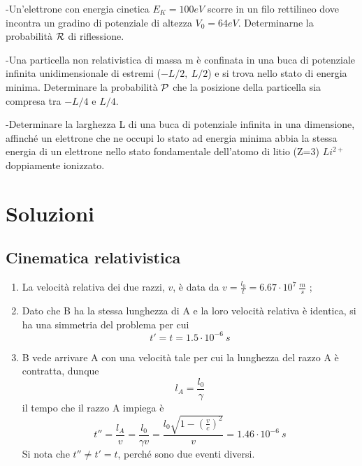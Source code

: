 \documentclass[12pt,twoside,a4]{article}
\begin{document}
\begin{esercizio}
	-Un'elettrone con energia cinetica $E_K = 100 eV$ scorre in un filo rettilineo dove incontra un gradino di potenziale di altezza $V_0 = 64 eV$. Determinarne la probabilità  $\R$ di riflessione.
\end{esercizio}

\begin{esercizio}
	-Una particella non relativistica di massa m è confinata in una buca di potenziale infinita unidimensionale di estremi ($-L/2, \ L/2$) e si trova nello stato di energia minima. Determinare la probabilità  $\P$ che la posizione della particella sia compresa tra $- L/4$ e $L/4$.
\end{esercizio}

\begin{esercizio}
	-Determinare la larghezza L di una buca di potenziale infinita in una dimensione, affinché un elettrone che ne occupi lo stato ad energia minima abbia la stessa energia di un elettrone nello stato fondamentale dell'atomo di litio (Z=3) $Li^{2+}$ doppiamente ionizzato.
\end{esercizio}



\newpage
{}
\section{Soluzioni}
\subsection{Cinematica relativistica}
\begin{solution}
\vspace{-1cm}
\begin{enumerate}[label=(\textit{\roman*})]
	\item La velocità relativa dei due razzi, $v$, è data da $v = \frac{l_0}{t} = 6.67 \cdot 10^7 \ \frac{m}{s}$ ; 
    \item Dato che B ha la stessa lunghezza di A e la loro velocità relativa è identica, si ha una simmetria del problema per cui
        \begin{equation*}
            t' = t = 1.5 \cdot 10^{-6} \ s 
        \end{equation*}
    \item B vede arrivare A con una velocità tale per cui la lunghezza del razzo A è contratta, dunque 
        \begin{equation*}
            l_A = \frac{l_0}{\gamma} 
        \end{equation*}
    il tempo che il razzo A impiega è
        \begin{equation*}
            t'' = \frac{l_A}{v} = \frac{l_0}{\gamma v} = \frac{l_0 \sqrt{1-\left(\frac{v}{c}\right)^2}}{v} = 1.46 \cdot 10^{-6} \ s 
        \end{equation*}
    Si nota che $t'' \neq t' = t$, perché sono due eventi diversi.
\end{enumerate}
\end{solution}
\end{document}
